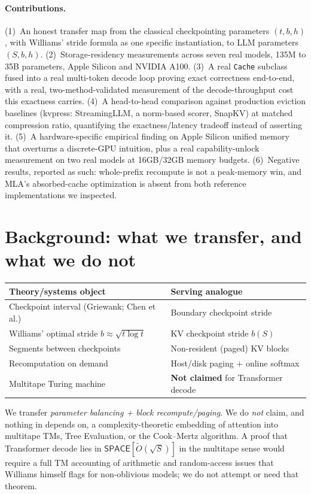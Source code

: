 \documentclass[11pt]{article}
\begin{document}
\paragraph{Contributions.}
(1)~An honest transfer map from the classical checkpointing parameters
$(t,b,h)$, with Williams' stride formula as one specific instantiation, to
LLM parameters $(S,b,h)$.
(2)~Storage-residency measurements across seven real models, 135M to 35B
parameters, Apple Silicon and NVIDIA A100.
(3)~A real \texttt{Cache} subclass fused into a real multi-token decode
loop proving exact correctness end-to-end, with a real, two-method-validated
measurement of the decode-throughput cost this exactness carries.
(4)~A head-to-head comparison against production eviction baselines
(kvpress: StreamingLLM, a norm-based scorer, SnapKV) at matched compression
ratio, quantifying the exactness/latency tradeoff instead of asserting it.
(5)~A hardware-specific empirical finding on Apple Silicon unified memory
that overturns a discrete-GPU intuition, plus a real capability-unlock
measurement on two real models at 16GB/32GB memory budgets.
(6)~Negative results, reported as such: whole-prefix recompute is not a
peak-memory win, and MLA's absorbed-cache optimization is absent from both
reference implementations we inspected.

\section{Background: what we transfer, and what we do not}

\begin{center}
\begin{tabular}{@{}ll@{}}
\toprule
Theory/systems object & Serving analogue \\
\midrule
Checkpoint interval (Griewank; Chen et al.) & Boundary checkpoint stride \\
Williams' optimal stride $b\approx\sqrt{t\log t}$ & KV checkpoint stride $b(S)$ \\
Segments between checkpoints & Non-resident (paged) KV blocks \\
Recomputation on demand & Host/disk paging + online softmax \\
Multitape Turing machine & \textbf{Not claimed} for Transformer decode \\
\bottomrule
\end{tabular}
\end{center}
We transfer \emph{parameter balancing + block recompute/paging}. We do
\emph{not} claim, and nothing in  depends on, a
complexity-theoretic embedding of attention into multitape TMs, Tree
Evaluation, or the Cook--Mertz algorithm. A proof that Transformer decode
lies in $\mathsf{SPACE}[\tilde O(\sqrt{S})]$ in the multitape sense would
require a full TM accounting of arithmetic and random-access issues that
Williams himself flags for non-oblivious models; we do not attempt or need
that theorem.
\end{document}
